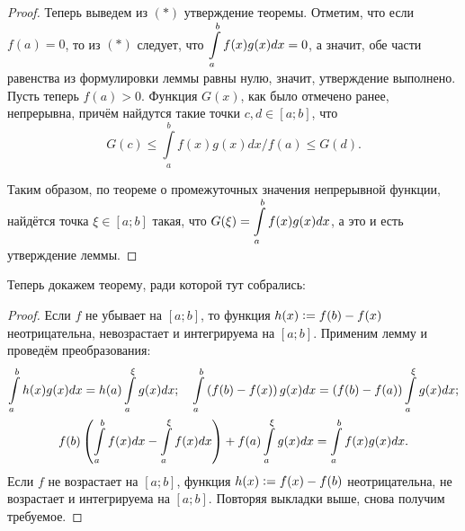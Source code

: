 \begin{proof}
    Теперь выведем из $(\ast)$ утверждение теоремы. Отметим, что если $f(a) = 0$, то из $(\ast)$ следует, что $\displaystyle\int\limits_a^bf(x)g(x)dx = 0$, а значит, обе части равенства из формулировки леммы равны нулю, значит, утверждение выполнено. Пусть теперь $f(a) > 0$. Функция $G(x)$, как было отмечено ранее, непрерывна, причём найдутся такие точки $c, d \in [a; b]$, что
    \[
        G(c) \leqslant \int\limits_a^bf(x)g(x)dx \bigg/f(a) \leqslant G(d).
    \]

    Таким образом, по теореме о промежуточных значения непрерывной функции, найдётся точка $\xi \in [a; b]$ такая, что $\displaystyle G(\xi) = \int\limits_a^bf(x)g(x)dx$, а это и есть утверждение леммы.
\end{proof}

Теперь докажем теорему, ради которой тут собрались:

\begin{proof}
    Если $f$ не убывает на $[a; b]$, то функция $h(x) \vcentcolon = f(b) - f(x)$ неотрицательна, невозрастает и интегрируема на $[a; b]$. Применим лемму и проведём преобразования:
    \begin{gather*}
        \int\limits_a^bh(x)g(x)dx = h(a)\int\limits_a^\xi g(x)dx;\quad\int\limits_a^b\left(f(b) - f(x)\right)g(x)dx = \left(f(b) - f(a)\right)\int\limits_a^\xi g(x)dx;\\
        f(b)\left(\int\limits_a^bf(x)dx - \int\limits_a^\xi f(x)dx\right) + f(a)\int\limits_a^\xi g(x)dx = \int\limits_a^bf(x)g(x)dx.
    \end{gather*}
    Если $f$ не возрастает на $[a; b]$, функция $h(x) \vcentcolon = f(x) - f(b)$ неотрицательна, не возрастает и интегрируема на $[a; b]$. Повторяя выкладки выше, снова получим требуемое.
\end{proof}

